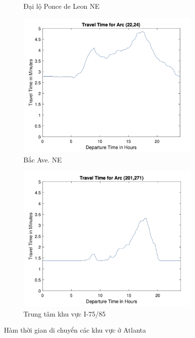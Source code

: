 \documentclass[../main.tex]{subfiles}
\begin{document}
\begin{figure}
\begin{subfigure}{0.45\textwidth}
        \caption{Đại lộ Ponce de Leon NE}
        \label{fig:15b}
    \end{subfigure}
    \begin{subfigure}{0.45\textwidth}
        \centering
        \includegraphics{edited-images/Figure15c.jpg}
        \caption{Bắc Ave. NE}
        \label{fig:15c}
    \end{subfigure}
    \begin{subfigure}{0.45\textwidth}
        \centering
        \includegraphics{edited-images/Figure15d.jpg}
        \caption{Trung tâm khu vực I-75/85}
        \label{fig:15d}
    \end{subfigure}
    \caption{Hàm thời gian di chuyển các khu vực ở Atlanta}
    \label{fig:15}
\end{figure}
\end{document}
